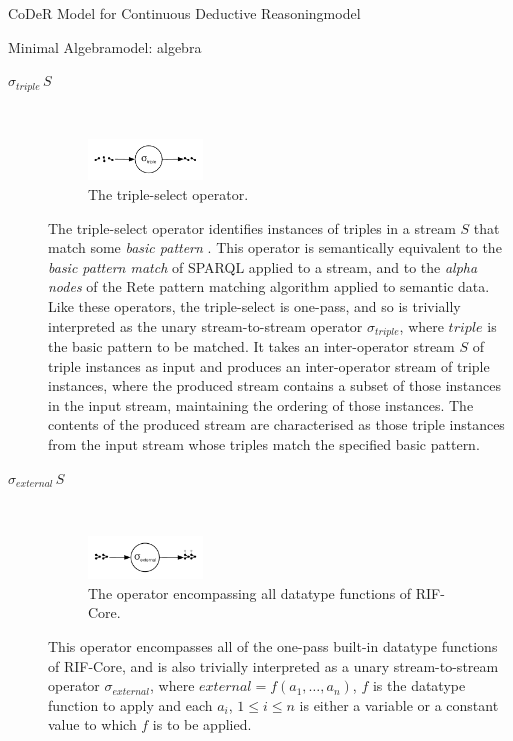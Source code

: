 \begin{nestedsection}{CoDeR Model for Continuous Deductive Reasoning}{model}
\begin{nestedsection}{Minimal Algebra}{model: algebra}
		\begin{description}
			\item[$\sigma_{triple}\,S$] \hfill \\
				\begin{figure}[t]
					\centering
					\includegraphics[width=0.3\textwidth]{basic-pattern-match}
					\caption{The triple-select operator.}
				\end{figure}
				The triple-select operator identifies instances of triples in a stream $S$ that match some \emph{basic pattern} \citep{w3csparql}.
				This operator is semantically equivalent to the \emph{basic pattern match} of SPARQL applied to a stream, and to the \emph{alpha nodes} of the Rete pattern matching algorithm \citep{forgy79} applied to semantic data.
				Like these operators, the triple-select is one-pass, and so is trivially interpreted as the unary stream-to-stream operator $\sigma_{triple}$, where ${triple}$ is the basic pattern to be matched.
				It takes an inter-operator stream $S$ of triple instances as input and produces an inter-operator stream of triple instances, where the produced stream contains a subset of those instances in the input stream, maintaining the ordering of those instances.
				The contents of the produced stream are characterised as those triple instances from the input stream whose triples match the specified basic pattern.
			\item[$\sigma_{external}\,S$] \hfill \\
				\begin{figure}[b]
					\centering
					\includegraphics[width=0.3\textwidth]{datatype-function}
					\caption{The operator encompassing all datatype functions of RIF-Core.}
				\end{figure}
				This operator encompasses all of the one-pass built-in datatype functions of RIF-Core, and is also trivially interpreted as a unary stream-to-stream operator $\sigma_{external}$, where ${external = f(a_1,\dots,a_n)}$, $f$ is the datatype function to apply and each $a_i$, ${1 \leq i \leq n}$ is either a variable or a constant value to which $f$ is to be applied.

\end{description}
\end{nestedsection}
\end{nestedsection}
